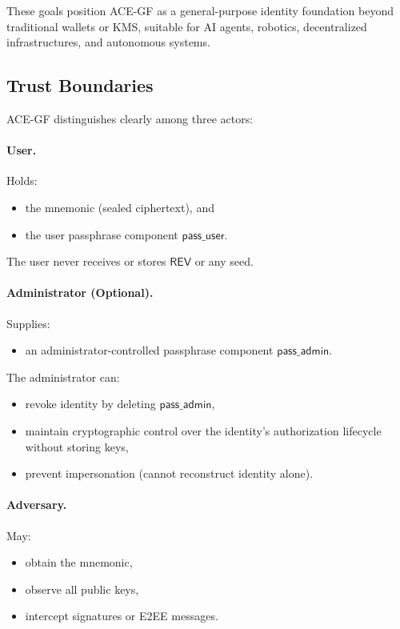 \documentclass[12pt,a4paper]{article}
\begin{document}
  These goals position ACE-GF as a general-purpose identity foundation
  beyond traditional wallets or KMS, suitable for AI agents, robotics,
  decentralized infrastructures, and autonomous systems.

  \subsection{Trust Boundaries}

  ACE-GF distinguishes clearly among three actors:

  \paragraph{User.}
  Holds:
  \begin{itemize}
   \item the mnemonic (sealed ciphertext), and
   \item the user passphrase component $\mathsf{pass\_user}$.
  \end{itemize}
  The user never receives or stores $\mathsf{REV}$ or any seed.

  \paragraph{Administrator (Optional).}
  Supplies:
  \begin{itemize}
   \item an administrator-controlled passphrase component $\mathsf{pass\_admin}$.
  \end{itemize}
  The administrator can:
  \begin{itemize}
   \item revoke identity by deleting $\mathsf{pass\_admin}$,
   \item maintain cryptographic control over the identity's authorization lifecycle without storing keys,
   \item prevent impersonation (cannot reconstruct identity alone).
  \end{itemize}

  \paragraph{Adversary.}
  May:
  \begin{itemize}
   \item obtain the mnemonic,
   \item observe all public keys,
   \item intercept signatures or E2EE messages.
  \end{itemize}
\end{document}
